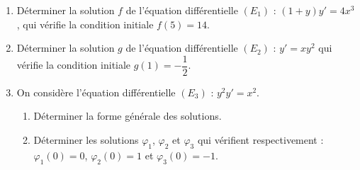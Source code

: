 
\begin{exercice}\label{exostarterST-0023}

\begin{enumerate}
\item Déterminer la solution $f$ de l'équation différentielle $(E_{1})$ : $(1+y)y'=4x^3$, qui vérifie  la condition initiale $f(5)=14$.
\item Déterminer la solution $g$ de l'équation différentielle $(E_{2})$ :  $y'=xy^2$ qui vérifie  la condition initiale $g(1)=-\dfrac{1}{2}$.
\item On considère l'équation différentielle $(E_{3})$ : $y^2y'=x^2$. 
\begin{enumerate}
\item Déterminer la forme générale des solutions.
\item
Déterminer les solutions $\varphi_{1}$, $\varphi_{2}$ et $\varphi_{3}$ qui vérifient respectivement : $\varphi_{1}(0)=0$, $\varphi_{2}(0)=1$ et $\varphi_{3}(0)=-1$. 
 \end{enumerate}
\end{enumerate}  


\end{exercice}
